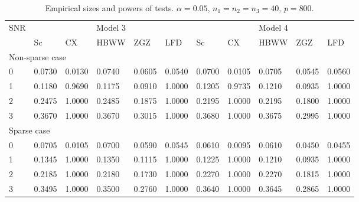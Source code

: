 \documentclass[12pt]{article} %
\theoremstyle{definition}
\begin{document}
\begin{table}[!hbp]
    \caption{Empirical sizes and powers of tests. $\alpha=0.05$, $n_1=n_2=n_3=40$, $p=800$. }
    \label{table4}
    \centering
    \begin{tabular}{*{11}{l}}
    \toprule
    \multirow{2}{*}{SNR} &\multicolumn{5}{c}{Model $3$}&
    \multicolumn{5}{c}{Model $4$} \\
        \cmidrule(r){2-6}\cmidrule(r){7-11}
& Sc & CX & HBWW & ZGZ & LFD & Sc & CX & HBWW & ZGZ & LFD \\ 
    \midrule
    \multicolumn{5}{l}{Non-sparse case}
    \\
    \midrule
   0 & 0.0730 & 0.0130 & 0.0740 & 0.0605 & 0.0540 & 0.0700 & 0.0105 & 0.0705 & 0.0545 & 0.0560 \\ 
      1 & 0.1180 & 0.9690 & 0.1175 & 0.0910 & 1.0000 & 0.1205 & 0.9735 & 0.1210 & 0.0935 & 1.0000 \\ 
      2 & 0.2475 & 1.0000 & 0.2485 & 0.1875 & 1.0000 & 0.2195 & 1.0000 & 0.2195 & 0.1800 & 1.0000 \\ 
      3 & 0.3670 & 1.0000 & 0.3670 & 0.3015 & 1.0000 & 0.3680 & 1.0000 & 0.3675 & 0.2995 & 1.0000 \\ 

    \midrule
    \multicolumn{5}{l}{Sparse case}
    \\
    \midrule

      0 & 0.0705 & 0.0105 & 0.0700 & 0.0590 & 0.0545 & 0.0610 & 0.0095 & 0.0610 & 0.0450 & 0.0455 \\ 
      1 & 0.1345 & 1.0000 & 0.1350 & 0.1115 & 1.0000 & 0.1225 & 1.0000 & 0.1210 & 0.0935 & 1.0000 \\ 
      2 & 0.2185 & 1.0000 & 0.2180 & 0.1730 & 1.0000 & 0.2270 & 1.0000 & 0.2270 & 0.1815 & 1.0000 \\ 
      3 & 0.3495 & 1.0000 & 0.3500 & 0.2760 & 1.0000 & 0.3640 & 1.0000 & 0.3645 & 0.2865 & 1.0000 \\ 




\bottomrule
\end{tabular}
\end{table}
\end{document}
